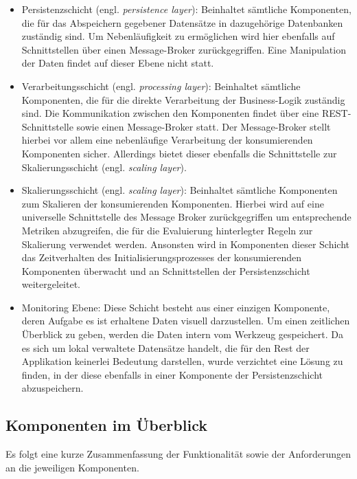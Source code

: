 \begin{itemize}
  \item Persistenzschicht (engl. \emph{persistence layer}): Beinhaltet sämtliche Komponenten, die für das Abspeichern gegebener Datensätze in dazugehörige Datenbanken zuständig sind. Um Nebenläufigkeit zu ermöglichen wird hier ebenfalls auf Schnittstellen über einen Message-Broker zurückgegriffen. Eine Manipulation der Daten findet auf dieser Ebene nicht statt.
  \item Verarbeitungsschicht (engl. \emph{processing layer}): Beinhaltet sämtliche Komponenten, die für die direkte Verarbeitung der Business-Logik zuständig sind. Die Kommunikation zwischen den Komponenten findet über eine REST-Schnittstelle sowie einen Message-Broker statt. Der Message-Broker stellt hierbei vor allem eine nebenläufige Verarbeitung der konsumierenden Komponenten sicher. Allerdings bietet dieser ebenfalls die Schnittstelle zur Skalierungsschicht (engl. \emph{scaling layer}).
  \item Skalierungsschicht (engl. \emph{scaling layer}): Beinhaltet sämtliche Komponenten zum Skalieren der konsumierenden Komponenten. Hierbei wird auf eine universelle Schnittstelle des Message Broker zurückgegriffen um entsprechende Metriken abzugreifen, die für die Evaluierung hinterlegter Regeln zur Skalierung verwendet werden. Ansonsten wird in Komponenten dieser Schicht das Zeitverhalten des Initialisierungsprozesses der konsumierenden Komponenten überwacht und an Schnittstellen der Persistenzschicht weitergeleitet.
  \item Monitoring Ebene: Diese Schicht besteht aus einer einzigen Komponente, deren Aufgabe es ist erhaltene Daten visuell darzustellen. Um einen zeitlichen Überblick zu geben, werden die Daten intern vom Werkzeug gespeichert. Da es sich um lokal verwaltete Datensätze handelt, die für den Rest der Applikation keinerlei Bedeutung darstellen, wurde verzichtet eine Lösung zu finden, in der diese ebenfalls in einer Komponente der Persistenzschicht abzuspeichern.
\end{itemize}

\subsection{Komponenten im Überblick \checkmark}
Es folgt eine kurze Zusammenfassung der Funktionalität sowie der Anforderungen an die jeweiligen Komponenten.

